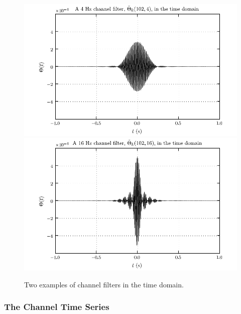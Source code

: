 \documentclass[10pt]{article}
\begin{document}
\begin{figure}
\begin{center}
\includegraphics{figures/timedomainfilter_04hz.pdf}
\includegraphics{figures/timedomainfilter_16hz.pdf}
\end{center}
\caption{Two examples of channel filters in the time domain.}
\label{fig:timedomainfilter}
\end{figure}


\subsubsection{The Channel Time Series}
\end{document}
